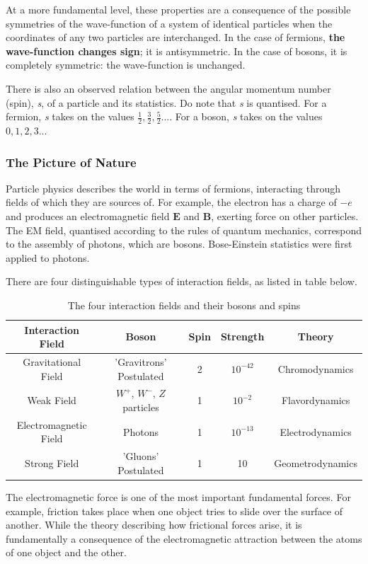 At a more fundamental level, these properties are a consequence of the possible symmetries of the wave-function of a system of identical particles when the coordinates of any two particles are interchanged. In the case of fermions, \textbf{the wave-function changes sign}; it is antisymmetric. In the case of bosons, it is completely symmetric: the wave-function is unchanged.

There is also an observed relation between the angular momentum number (spin), \textit{s}, of a particle and its statistics. Do note that \textit{s} is quantised. For a fermion, \textit{s} takes on the values $\frac{1}{2},\frac{3}{2},\frac{5}{2}...$. For a boson, \textit{s} takes on the values $0,1,2,3...$

\subsubsection{The Picture of Nature}
Particle physics describes the world in terms of fermions, interacting through fields of which they are sources of. For example, the electron has a charge of $-e$ and produces an electromagnetic field $\mathbf{E}$ and $\mathbf{B}$, exerting force on other particles. The EM field, quantised according to the rules of quantum mechanics, correspond to the assembly of photons, which are bosons. Bose-Einstein statistics were first applied to photons.

There are four distinguishable types of interaction fields, as listed in table below.
\begin{table}[http]
\begin{center}
\begin{tabular}{|c|c|c|c|c|}
\hline Interaction Field & Boson & Spin & Strength & Theory \\ \hline
Gravitational Field & 'Gravitrons' Postulated & 2 & $10^{-42}$ & Chromodynamics \\
Weak Field & $W^+$, $W^-$, $Z$ particles & 1 & $10^{-2}$ & Flavordynamics\\
Electromagnetic Field & Photons & 1 & $10^{-13}$ & Electrodynamics\\
Strong Field & 'Gluons' Postulated & 1 & 10 & Geometrodynamics\\
\hline
\end{tabular}
\end{center}
\label{default}
\caption{The four interaction fields and their bosons and spins}
\end{table}

The electromagnetic force is one of the most important fundamental forces. For example, friction takes place when one object tries to slide over the surface of another. While the theory describing how frictional forces arise, it is fundamentally a consequence of the electromagnetic attraction between the atoms of one object and the other.


